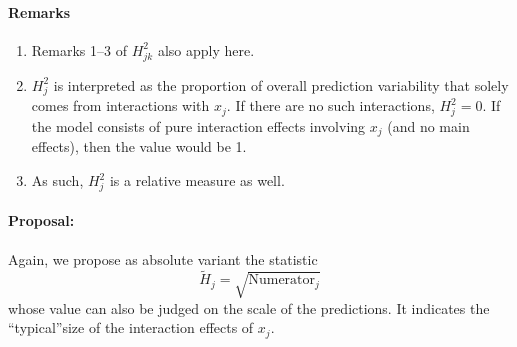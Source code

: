 \documentclass[]{article}
\begin{document}
\paragraph{Remarks}
\begin{enumerate}
	\item Remarks 1--3 of $H^2_{jk}$ also apply here.
	\item $H^2_j$ is interpreted as the proportion of overall prediction variability that solely comes from interactions with $x_j$. If there are no such interactions, $H^2_j = 0$. If the model consists of pure interaction effects involving $x_j$ (and no main effects), then the value would be 1.
	\item As such, $H^2_j$ is a relative measure as well.
\end{enumerate}

\paragraph{Proposal:}
Again, we propose as absolute variant the statistic
$$
  \tilde H_{j} = \sqrt{\mathrm{Numerator}_{j}}
$$
whose value can also be judged on the scale of the predictions. It indicates the ``typical''size of the interaction effects of $x_j$.
\end{document}
